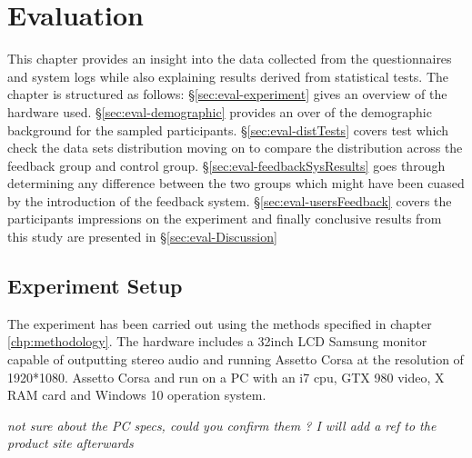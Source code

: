 \chapter{Evaluation}
This chapter provides an insight into the data collected from the questionnaires and \methodname system logs while also explaining results derived from statistical tests. The chapter is structured as follows: \S\ref{sec:eval-experiment} gives an overview of the hardware used. \S\ref{sec:eval-demographic} provides an over of the demographic background for the sampled participants. \S\ref{sec:eval-distTests} covers test which check the data sets distribution moving on to compare the distribution across the feedback group and control group. \S\ref{sec:eval-feedbackSysResults} goes through determining any difference between the two groups which might have been cuased by the introduction of the feedback system. \S\ref{sec:eval-usersFeedback} covers the participants impressions on the experiment and finally conclusive results from this study are presented in \S\ref{sec:eval-Discussion} 

\section{Experiment Setup}

The experiment has been carried out using the methods specified in chapter \ref{chp:methodology}. The hardware includes a 32inch LCD Samsung monitor capable of outputting stereo audio and running Assetto Corsa at the resolution of 1920*1080. Assetto Corsa and \methodname run on a PC with an i7 cpu, GTX 980 video, X RAM card and Windows 10 operation system.

\emph{not sure about the PC specs, could you confirm them ? I will add a ref to the product site afterwards}

